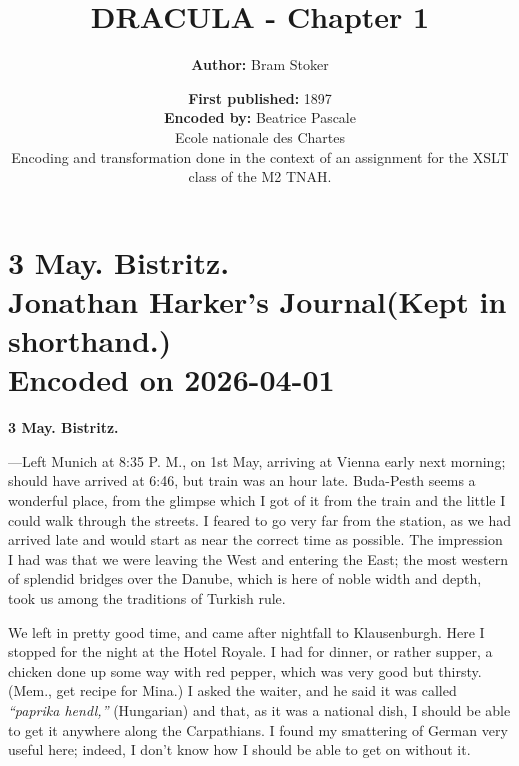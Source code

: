 \documentclass{article}
\begin{document}
        
            \title{\textbf{DRACULA - Chapter 1}}
            \author{\textbf{Author:} Bram Stoker}
            \date{\textbf{First published:} 1897 \\[2ex]
                  \textbf{Encoded by:} Beatrice Pascale \\ Ecole nationale des Chartes \\
                  Encoding and transformation done in the context of an assignment for the XSLT class of the M2 TNAH.
}
        
        
            \maketitle
            \clearpage
            \tableofcontents
            \clearpage
            

			
				
				\section[3 May. Bistritz. --- Jonathan Harker's Journal]{{\huge 3 May. Bistritz. \\ Jonathan Harker's Journal\newline (Kept in shorthand.)}\\ Encoded on 2026-04-01}\par\bigskip\noindent 
			

			
				\noindent\textbf{3 May. Bistritz.}\par\medskip
				
				—Left Munich at 8:35 P. M., on 1st May, arriving at Vienna early next morning; should have arrived at 6:46, but train was an hour late. Buda-Pesth seems a wonderful place, from the glimpse which I got of it from the train and the little I could walk through the streets. I feared to go very far from the station, as we had arrived late and would start as near the correct time as possible. The impression I had was that we were leaving the West and entering the East; the most western of splendid bridges over the Danube, which is here of noble width and depth, took us among the traditions of Turkish rule.\par\bigskip
				
				We left in pretty good time, and came after nightfall to Klausenburgh. Here I stopped for the night at the Hotel Royale. I had for dinner, or rather supper, a chicken done up some way with red pepper, which was very good but thirsty. (Mem., get recipe for Mina.) I asked the waiter, and he said it was called \textit{“paprika hendl,”} (Hungarian) and that, as it was a national dish, I should be able to get it anywhere along the Carpathians. I found my smattering of German very useful here; indeed, I don’t know how I should be able to get on without it.\par\bigskip
				
\end{document}
